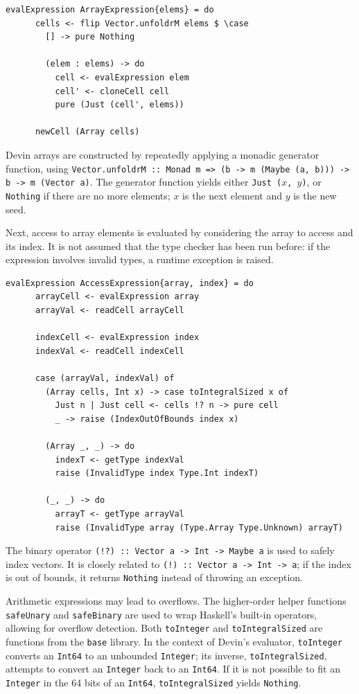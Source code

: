 \documentclass[UdineBachThesis,american,11pt]{PhdThesis}
\begin{document}
  \begin{Verbatim}[gobble=4,fontsize=\small]
    evalExpression ArrayExpression{elems} = do
      cells <- flip Vector.unfoldrM elems $ \case
        [] -> pure Nothing

        (elem : elems) -> do
          cell <- evalExpression elem
          cell' <- cloneCell cell
          pure (Just (cell', elems))

      newCell (Array cells)
  \end{Verbatim}

  Devin arrays are constructed by repeatedly applying a monadic generator
  function, using
  \mbox{\texttt{Vector.unfoldrM :: Monad m => (b -> m (Maybe (a, b))) -> b -> m (Vector a)}}.
  The generator function yields either \mbox{\texttt{Just ($x$, $y$)}}, or
  \mbox{\texttt{Nothing}} if there are no more elements; $x$ is the next element
  and $y$ is the new seed.

  Next, access to array elements is evaluated by considering the array to access
  and its index. It is not assumed that the type checker has been run before: if
  the expression involves invalid types, a runtime exception is raised.

  \begin{Verbatim}[gobble=4,fontsize=\small]
    evalExpression AccessExpression{array, index} = do
      arrayCell <- evalExpression array
      arrayVal <- readCell arrayCell

      indexCell <- evalExpression index
      indexVal <- readCell indexCell

      case (arrayVal, indexVal) of
        (Array cells, Int x) -> case toIntegralSized x of
          Just n | Just cell <- cells !? n -> pure cell
          _ -> raise (IndexOutOfBounds index x)

        (Array _, _) -> do
          indexT <- getType indexVal
          raise (InvalidType index Type.Int indexT)

        (_, _) -> do
          arrayT <- getType arrayVal
          raise (InvalidType array (Type.Array Type.Unknown) arrayT)
  \end{Verbatim}

  The binary operator \mbox{\texttt{(!?) :: Vector a -> Int -> Maybe a}} is used
  to safely index vectors. It is closely related to
  \mbox{\texttt{(!) :: Vector a -> Int -> a}}; if the index is out of bounds, it
  returns \mbox{\texttt{Nothing}} instead of throwing an exception.

  Arithmetic expressions may lead to overflows. The higher-order helper
  functions \mbox{\texttt{safeUnary}} and \mbox{\texttt{safeBinary}} are used to
  wrap Haskell's built-in operators, allowing for overflow detection. Both
  \mbox{\texttt{toInteger}} and \mbox{\texttt{toIntegralSized}} are functions
  from the \mbox{\texttt{base}} library. In the context of Devin's evaluator,
  \mbox{\texttt{toInteger}} converts an \mbox{\texttt{Int64}} to an unbounded
  \mbox{\texttt{Integer}}; its inverse, \mbox{\texttt{toIntegralSized}},
  attempts to convert an \mbox{\texttt{Integer}} back to an
  \mbox{\texttt{Int64}}. If it is not possible to fit an \mbox{\texttt{Integer}}
  in the 64 bits of an \mbox{\texttt{Int64}}, \mbox{\texttt{toIntegralSized}}
  yields \mbox{\texttt{Nothing}}.
\end{document}
